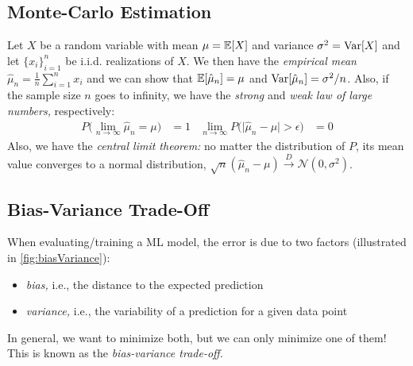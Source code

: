 		\subsection{Monte-Carlo Estimation}
			Let \(X\) be a random variable with mean \( \mu = \mathbb{E}[X] \) and variance \( \sigma^2 = \operatorname{Var}[X] \) and let \( \{ x_i \}_{i = 1}^{n} \) be i.i.d. realizations of \(X\). We then have the \emph{empirical mean} \( \hat{\mu}_n = \frac{1}{n} \sum_{i = 1}^{n} x_i \) and we can show that \( \mathbb{E}[\hat{\mu}_n] = \mu \) and \( \operatorname{Var}[\hat{\mu}_n] = \sigma^2/n \). Also, if the sample size \(n\) goes to infinity, we have the \emph{strong} and \emph{weak law of large numbers,} respectively:
			\begin{align}
				P\bigl( \lim\limits_{n \to \infty} \hat{\mu}_n = \mu \bigr)                          & = 1 &
				\lim\limits_{n \to \infty} P\bigl( \lvert \hat{\mu}_n - \mu \rvert > \epsilon \bigr) & = 0
			\end{align}
			Also, we have the \emph{central limit theorem:} no matter the distribution of \(P\), its mean value converges to a normal distribution, \( \sqrt{n} (\hat{\mu}_n - \mu) \overset{D}{\to} \mathcal{N}(0, \sigma^2) \).

		\subsection{Bias-Variance Trade-Off}
			When evaluating/training a \ac{ML} model, the error is due to two factors (illustrated in \autoref{fig:biasVariance}):
			\begin{itemize}
				\item \emph{bias,} i.e., the distance to the expected prediction
				\item \emph{variance,} i.e., the variability of a prediction for a given data point
			\end{itemize}
			In general, we want to minimize both, but we can only minimize one of them! This is known as the \emph{bias-variance trade-off.}


